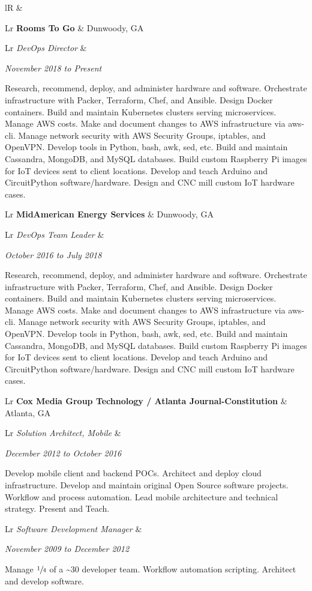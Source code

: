 \documentclass[letterpaper,10pt]{article}
\newcommand{\sizeF}[0]{\fontsize{11pt}{13pt}\selectfont}
\newcounter{skipfirstcounter}
\newcommand{\skipfirst}[1]{
    \ifthenelse{\equal{\value{skipfirstcounter}}{0}}{#1}{#1}
    \addtocounter{skipfirstcounter}{1}
}
\newcommand{\blocktitle}[1]{
    \setcounter{skipfirstcounter}{0}
    \begin{tabularx}{\textwidth}{lR}
        {\sizeF\sc{#1}} & \noindent\hrulefill\\
    \end{tabularx}
}
\newcommand{\blockExperience}[1]{
    \blocktitle{Career}%
    #1%
    \vspace{2mm}%
}
\newcommand{\sectionheaderfirst}[2]{
    \begin{tabularx}{\textwidth}{Lr}%
    \textbf{#1} & #2\\%
    \end{tabularx}%
}
\newcommand{\sectionheader}[2]{
    \vspace{2mm}%
    \sectionheaderfirst{#1}{#2}%
}
\newcommand{\sectionsub}[2]{
    {\def\arraystretch{1}
        \begin{tabularx}{\textwidth}{Lr}
        \rowcolor[rgb]{.9,.9,.9}
        \emph{#1} &
        \rule{0mm}{3.2mm} %
        \emph{#2} \\
        \addlinespace[0.4mm]
        \end{tabularx}
    }
}
\newcommand{\sectionbody}[1]{
    #1
    \vspace{1mm}
}
\begin{document}
\blockExperience{
    \sectionheaderfirst
    {Rooms To Go}{Dunwoody, GA}
    \sectionsub
    {DevOps Director}
    {November 2018 to Present}
    \sectionbody{
    Research, recommend, deploy, and administer hardware and software.
    Orchestrate infrastructure with Packer, Terraform, Chef, and Ansible.
    Design Docker containers.
    Build and maintain Kubernetes clusters serving microservices.
    Manage AWS costs.
    Make and document changes to AWS infrastructure via aws-cli.
    Manage network security with AWS Security Groups, iptables, and OpenVPN.
    Develop tools in Python, bash, awk, sed, etc.
    Build and maintain Cassandra, MongoDB, and MySQL databases.
    Build custom Raspberry Pi images for IoT devices sent to client locations.
    Develop and teach Arduino and CircuitPython software/hardware.
    Design and CNC mill custom IoT hardware cases.
    }

    \sectionheader
    {MidAmerican Energy Services}{Dunwoody, GA}
    \sectionsub
    {DevOps Team Leader}
    {October 2016 to July 2018}
    \sectionbody{
    Research, recommend, deploy, and administer hardware and software.
    Orchestrate infrastructure with Packer, Terraform, Chef, and Ansible.
    Design Docker containers.
    Build and maintain Kubernetes clusters serving microservices.
    Manage AWS costs.
    Make and document changes to AWS infrastructure via aws-cli.
    Manage network security with AWS Security Groups, iptables, and OpenVPN.
    Develop tools in Python, bash, awk, sed, etc.
    Build and maintain Cassandra, MongoDB, and MySQL databases.
    Build custom Raspberry Pi images for IoT devices sent to client locations.
    Develop and teach Arduino and CircuitPython software/hardware.
    Design and CNC mill custom IoT hardware cases.
    }

    \sectionheader
    {Cox Media Group Technology / Atlanta Journal-Constitution}{Atlanta, GA}
    \sectionsub
    {Solution Architect, Mobile}
    {December 2012 to October 2016}
    \sectionbody{
    Develop mobile client and backend POCs.
    Architect and deploy cloud infrastructure.
    Develop and maintain original Open Source software projects.
    Workflow and process automation.
    Lead mobile architecture and technical strategy.
    Present and Teach.
    }

    \sectionsub
    {Software Development Manager}
    {November 2009 to December 2012}
    \sectionbody{
    Manage $\sfrac{1}{4}$ of a \~{}30 developer team.
    Workflow automation scripting.
    Architect and develop software.
    }

}
\end{document}
